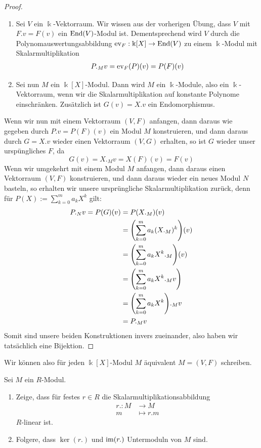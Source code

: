 \documentclass[10pt]{article}
\begin{document}
	\begin{proof}
		\begin{enumerate}
			\item Sei $V$ ein $\Bbbk$-Vektorraum. Wir wissen aus der vorherigen Übung, dass $V$ mit $F.v = F(v)$ ein $\textnormal{End}(V)$-Modul ist. Dementsprechend wird $V$ durch die Polynomauswertungsabbildung $\textnormal{ev}_F : \Bbbk[X] \to \textnormal{End}(V)$ zu einem $\Bbbk$-Modul mit Skalarmultiplikation
			\begin{align*}
				P._Mv = \textnormal{ev}_F(P)(v) = P(F)(v)
			\end{align*}
			\item Sei nun $M$ ein $\Bbbk[X]$-Modul. Dann wird $M$ ein $\Bbbk$-Module, also ein $\Bbbk$-Vektorraum, wenn wir die Skalarmultiplikation auf konstante Polynome einschränken. Zusätzlich ist $G(v) = X.v$ ein Endomorphismus.
		\end{enumerate}
		\newpar
		Wenn wir nun mit einem Vektorraum $(V,F)$ anfangen, dann daraus wie gegeben durch $P.v = P(F)(v)$ ein Modul $M$ konstruieren, und dann daraus durch $G = X.v$ wieder einen Vektorraum $(V,G)$ erhalten, so ist $G$ wieder unser urspüngliches $F$, da $$G(v) = X._Mv = X(F)(v) = F(v)$$ 
		Wenn wir umgekehrt mit einem Modul $M$ anfangen, dann daraus einen Vektorraum $(V,F)$ konstruieren, und dann daraus wieder ein neues Modul $N$ basteln, so erhalten wir unsere ursprüngliche Skalarmultiplikation zurück, denn für $P(X) := \sum_{k = 0}^m a_k X^k$ gilt:
		\begin{align*}
			P._Nv = P(G)(v) 
			&= P(X._M)(v)\\
			&= \qty(\sum_{k = 0}^m a_k (X._M)^k)(v)\\
			&= \qty(\sum_{k = 0}^m a_k X^k._M)(v)\\
			&= \qty(\sum_{k = 0}^m a_k X^k._Mv)\\
			&= \qty(\sum_{k = 0}^m a_k X^k)._Mv\\
			&= P._Mv
		\end{align*}
		Somit sind unsere beiden Konstruktionen invers zueinander, also haben wir tatsächlich eine Bijektion.
	\end{proof}
	Wir können also für jeden $\Bbbk[X]$-Modul $M$ äquivalent $M = (V,F)$ schreiben.
	\begin{exercise}
		Sei $M$ ein $R$-Modul.
		\begin{enumerate}
			\item Zeige, dass für festes $r \in R$ die Skalarmultiplikationsabbildung
			\begin{align*}
				r. : M &\to M\\
				m &\mapsto r.m
			\end{align*}
			$R$-linear ist.
			\item Folgere, dass $\ker(r.)$ und $\textnormal{im}(r.)$ Untermoduln von $M$ sind.
		\end{enumerate}
	\end{exercise}
\end{document}
